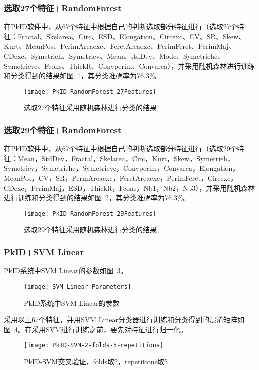 \subsubsection{选取27个特征+RandomForest}
在PkID软件中，从67个特征中根据自己的判断选取部分特征进行（选取27个特征：Fractal、Skelarea、Circ、ESD、Elongation、Circexc、CV、SR、Skew、Kurt、MeanPos、PerimAreaexc、FeretAreaexc、PerimFeret、PerimMaj、CDexc、Symetrieh、Symetriev、Mean、stdDev、Mode、Symetriehc、Symetrievc、Fcons、ThickR、Convperim、Convarea），并采用随机森林进行训练和分类得到的结果如图~\ref{fig:PkID-RandomForest-27Features}，其分类准确率为76.3\%。

\begin{figure}[!ht]
\centering
\texttt{[image: PkID-RandomForest-27Features]}
\caption{选取27个特征采用随机森林进行分类的结果}
\label{fig:PkID-RandomForest-27Features}
\end{figure}

\subsubsection{选取29个特征+RandomForest}
在PkID软件中，从67个特征中根据自己的判断选取部分特征进行（选取29个特征：Mean，StdDev，Fractal，Skelarea，Circ，Kurt，Skew，Symetrieh，Symetriev，Symetriehc，Symetrievc，Convperim，Convarea，Elongation，MeanPos，CV，SR，PermAreaexc，FeretAreaexc，PerimFeret，Circexc，CDexc，PerimMaj，ESD，ThickR，Fcons，Nb1，Nb2，Nb3），并采用随机森林进行训练和分类得到的结果如图~\ref{fig:PkID-RandomForest-29Features}，其分类准确率为76.3\%。

\begin{figure}[!ht]
\centering
\texttt{[image: PkID-RandomForest-29Features]}
\caption{选取29个特征采用随机森林进行分类的结果}
\label{fig:PkID-RandomForest-29Features}
\end{figure}

\subsubsection{PkID+SVM Linear}
PkID系统中SVM Linear的参数如图~\ref{fig:SVM-Linear-Parameters}。
\begin{figure}[!ht]
\centering
\texttt{[image: SVM-Linear-Parameters]}
\caption{PkID系统中SVM Linear的参数}
\label{fig:SVM-Linear-Parameters}
\end{figure}

采用以上67个特征，并用SVM Linear分类器进行训练和分类得到的混淆矩阵如图~\ref{fig: PkID-SVM-2-folds-5-repetitions}。在采用SVM进行训练之前，要先对特征进行归一化。
\begin{figure}[!ht]
\centering
\texttt{[image: PkID-SVM-2-folds-5-repetitions]}
\caption{PkID-SVM交叉验证，folds取2，repetitions取5}
\label{fig: PkID-SVM-2-folds-5-repetitions}
\end{figure}

